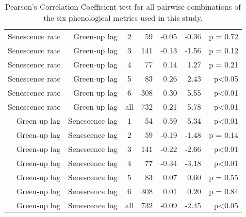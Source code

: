 \begin{table}[H]
\begin{tabular}{rrcrrrr}
  Senescence rate & Green-up lag & 2 &  59 & -0.05 & -0.36 & p = 0.72 \\ 
  Senescence rate & Green-up lag & 3 & 141 & -0.13 & -1.56 & p = 0.12 \\ 
  Senescence rate & Green-up lag & 4 &  77 & 0.14 & 1.27 & p = 0.21 \\ 
  Senescence rate & Green-up lag & 5 &  83 & 0.26 & 2.43 & p<0.05 \\ 
  Senescence rate & Green-up lag & 6 & 308 & 0.30 & 5.55 & p<0.01 \\ 
  Senescence rate & Green-up lag & all & 732 & 0.21 & 5.78 & p<0.01 \\ 
   \hline
Green-up lag & Senescence lag & 1 &  54 & -0.59 & -5.34 & p<0.01 \\ 
  Green-up lag & Senescence lag & 2 &  59 & -0.19 & -1.48 & p = 0.14 \\ 
  Green-up lag & Senescence lag & 3 & 141 & -0.22 & -2.66 & p<0.01 \\ 
  Green-up lag & Senescence lag & 4 &  77 & -0.34 & -3.18 & p<0.01 \\ 
  Green-up lag & Senescence lag & 5 &  83 & 0.07 & 0.60 & p = 0.55 \\ 
  Green-up lag & Senescence lag & 6 & 308 & 0.01 & 0.20 & p = 0.84 \\ 
  Green-up lag & Senescence lag & all & 732 & -0.09 & -2.45 & p<0.05 \\ 
   \hline
\end{tabular}
\caption{Pearson's Correlation Coefficient test for all pairwise combinations of the six phenological metrics used in this study.} 
\label{phen_corr}
\end{table}

